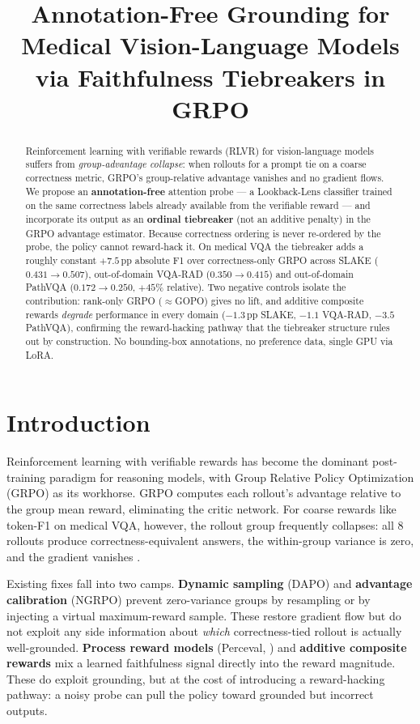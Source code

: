 \documentclass[11pt]{article}
\title{Annotation-Free Grounding for Medical Vision-Language Models\\via Faithfulness Tiebreakers in GRPO}
\author{
  \todo{author block — anonymize for review}
}
\date{}
\begin{document}
\maketitle

\begin{abstract}
Reinforcement learning with verifiable rewards (RLVR) for vision-language
models suffers from \emph{group-advantage collapse}: when rollouts for a
prompt tie on a coarse correctness metric, GRPO's group-relative
advantage vanishes and no gradient flows. We propose an
\textbf{annotation-free} attention probe --- a Lookback-Lens classifier
trained on the same correctness labels already available from the
verifiable reward --- and incorporate its output as an \textbf{ordinal
tiebreaker} (not an additive penalty) in the GRPO advantage estimator.
Because correctness ordering is never re-ordered by the probe, the
policy cannot reward-hack it. On medical VQA the tiebreaker adds a
roughly constant $+7.5$\,pp absolute F1 over correctness-only GRPO
across SLAKE ($0.431 \rightarrow 0.507$), out-of-domain VQA-RAD
($0.350 \rightarrow 0.415$) and out-of-domain PathVQA ($0.172
\rightarrow 0.250$, $+45\%$ relative). Two negative controls isolate
the contribution: rank-only GRPO ($\approx$GOPO) gives no lift, and
additive composite rewards \emph{degrade} performance in every domain
($-1.3$\,pp SLAKE, $-1.1$ VQA-RAD, $-3.5$ PathVQA), confirming the
reward-hacking pathway that the tiebreaker structure rules out by
construction. No bounding-box annotations, no preference data, single
GPU via LoRA.
\end{abstract}

\section{Introduction}

Reinforcement learning with verifiable rewards has become the dominant
post-training paradigm for reasoning models, with Group Relative Policy
Optimization (GRPO) \citep{deepseek-r1} as its workhorse. GRPO computes
each rollout's advantage relative to the group mean reward, eliminating the
critic network. For coarse rewards like token-F1 on medical VQA, however,
the rollout group frequently collapses: all 8 rollouts produce
correctness-equivalent answers, the within-group variance is zero, and the
gradient vanishes \citep{dapo,ngrpo}.

Existing fixes fall into two camps. \textbf{Dynamic sampling} (DAPO) and
\textbf{advantage calibration} (NGRPO) prevent zero-variance groups by
resampling or by injecting a virtual maximum-reward sample. These restore
gradient flow but do not exploit any side information about \emph{which}
correctness-tied rollout is actually well-grounded. \textbf{Process reward
models} (Perceval, \citealp{perceval}) and \textbf{additive composite
rewards} mix a learned faithfulness signal directly into the reward
magnitude. These do exploit grounding, but at the cost of introducing a
reward-hacking pathway: a noisy probe can pull the policy toward grounded
but incorrect outputs.
\end{document}
